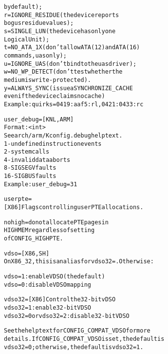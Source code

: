 \documentclass[a4paper,8pt,english]{sphinxmanual}
\begin{document}
\begin{alltt}
                                        by default);
                                r = IGNORE\_RESIDUE (the device reports
                                        bogus residue values);
                                s = SINGLE\_LUN (the device has only one
                                        Logical Unit);
                                t = NO\_ATA\_1X (don't allow ATA(12) and ATA(16)
                                        commands, uas only);
                                u = IGNORE\_UAS (don't bind to the uas driver);
                                w = NO\_WP\_DETECT (don't test whether the
                                        medium is write-protected).
                                y = ALWAYS\_SYNC (issue a SYNCHRONIZE\_CACHE
                                        even if the device claims no cache)
                        Example: quirks=0419:aaf5:rl,0421:0433:rc

        user\_debug=     {[}KNL,ARM{]}
                        Format: \textless{}int\textgreater{}
                        See arch/arm/Kconfig.debug help text.
                                 1 - undefined instruction events
                                 2 - system calls
                                 4 - invalid data aborts
                                 8 - SIGSEGV faults
                                16 - SIGBUS faults
                        Example: user\_debug=31

        userpte=
                        {[}X86{]} Flags controlling user PTE allocations.

                                nohigh = do not allocate PTE pages in
                                        HIGHMEM regardless of setting
                                        of CONFIG\_HIGHPTE.

        vdso=           {[}X86,SH{]}
                        On X86\_32, this is an alias for vdso32=.  Otherwise:

                        vdso=1: enable VDSO (the default)
                        vdso=0: disable VDSO mapping

        vdso32=         {[}X86{]} Control the 32-bit vDSO
                        vdso32=1: enable 32-bit VDSO
                        vdso32=0 or vdso32=2: disable 32-bit VDSO

                        See the help text for CONFIG\_COMPAT\_VDSO for more
                        details.  If CONFIG\_COMPAT\_VDSO is set, the default is
                        vdso32=0; otherwise, the default is vdso32=1.


\end{alltt}
\end{document}
